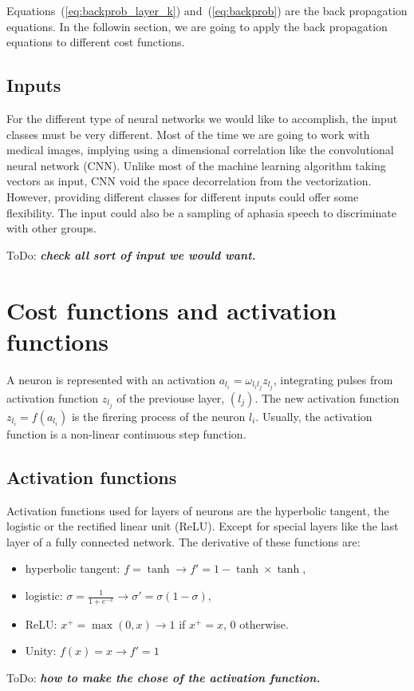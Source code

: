 \documentclass[final, paper=letter,5p,times,twocolumn]{elsarticle}
\newcommand{\ToDo}[1]{ToDo: \textbf{\textit{#1}}}
\begin{document}
Equations~(\ref{eq:backprob_layer_k}) and~(\ref{eq:backprob}) are the back propagation equations. In the followin section, we are going to apply the back propagation equations to different cost functions.


\subsection{Inputs}
For the different type of neural networks we would like to accomplish, the input classes must be very different. Most of the time we are going to work with medical images, implying using a dimensional correlation like the convolutional neural network (CNN). Unlike most of the machine learning algorithm taking vectors as input, CNN void the space decorrelation from the vectorization. However, providing different classes for different inputs could offer some flexibility. The input could also be a sampling of aphasia speech to discriminate with other groups.

\ToDo{check all sort of input we would want.} \\

\section{Cost functions and activation functions}

A neuron is represented with an activation $a_{l_{i}} = \omega_{l_{i}l_{j}} z_{l_{j}}$, integrating pulses from activation function $z_{l_{j}}$ of the previouse layer, $(l_{j})$. The new activation function $z_{l_{i}} = f(a_{l_{i}})$ is the firering process of the neuron $l_{i}$. Usually, the activation function is a non-linear continuous step function. 

\subsection{Activation functions}

Activation functions used for layers of neurons are the hyperbolic tangent, the logistic or the rectified linear unit (ReLU). Except for special layers like the last layer of a fully connected network. The derivative of these functions are:

\begin{itemize}
\item hyperbolic tangent: $f = \tanh \rightarrow f' = 1 - \tanh \times \tanh$,
\item logistic: $\sigma = \frac{1}{1+e^{-x}} \rightarrow \sigma' = \sigma (1 - \sigma)$,
\item ReLU: $x^{+} = \max(0,x) \rightarrow 1$ if $x^{+} = x$, 0 otherwise.
\item Unity: $f(x) = x \rightarrow f' = 1$
\end{itemize}
\ToDo{how to make the chose of the activation function.}
\end{document}
